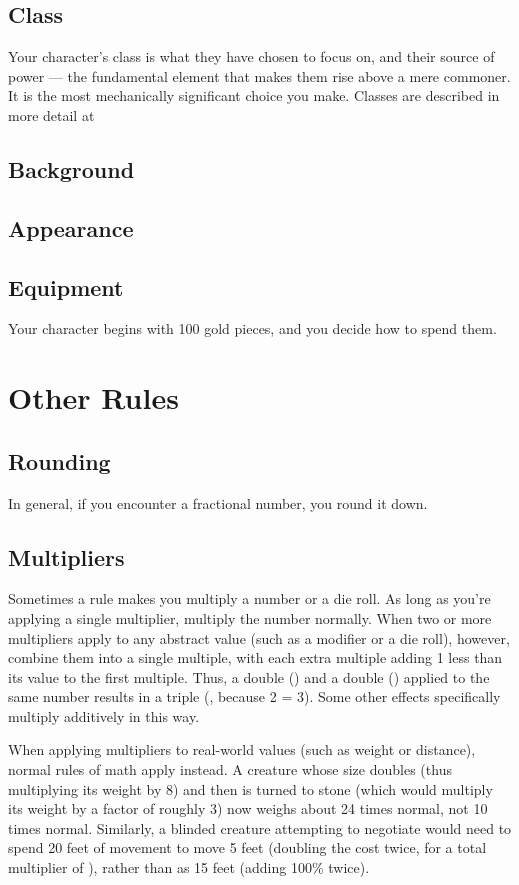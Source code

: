     \subsection{Class}
        Your character's class is what they have chosen to focus on, and their source of power --- the fundamental element that makes them rise above a mere commoner.
        It is the most mechanically significant choice you make.
        Classes are described in more detail at 

    \subsection{Background}

    \subsection{Appearance}

    \subsection{Equipment}
        Your character begins with 100 gold pieces, and you decide how to spend them.

\section{Other Rules}

    \subsection{Rounding}
        In general, if you encounter a fractional number, you round it down.

    \subsection{Multipliers}
        Sometimes a rule makes you multiply a number or a die roll.
        As long as you're applying a single multiplier, multiply the number normally.
        When two or more multipliers apply to any abstract value (such as a modifier or a die roll), however, combine them into a single multiple, with each extra multiple adding 1 less than its value to the first multiple.
        Thus, a double () and a double () applied to the same number results in a triple (, because 2  = 3).
        Some other effects specifically multiply additively in this way.

        When applying multipliers to real-world values (such as weight or distance), normal rules of math apply instead.
        A creature whose size doubles (thus multiplying its weight by 8) and then is turned to stone (which would multiply its weight by a factor of roughly 3) now weighs about 24 times normal, not 10 times normal.
        Similarly, a blinded creature attempting to negotiate  would need to spend 20 feet of movement to move 5 feet (doubling the cost twice, for a total multiplier of ), rather than as 15 feet (adding 100\% twice).
